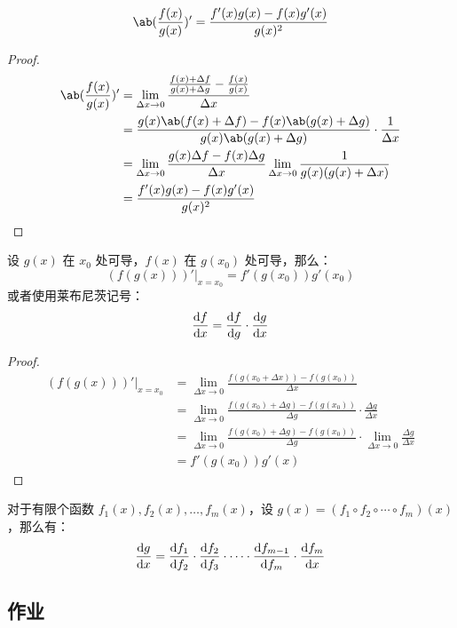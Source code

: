 \begin{theorem}[导数的除法法则]
	$$
	\ab(\frac{f(x)}{g(x)})' = \frac{f'(x) g(x) - f(x) g'(x)}{g(x)^2}
	$$
	\begin{proof}
		$$
		\begin{aligned}
			\ab(\frac{f(x)}{g(x)})' & = \lim_{\Delta x \to 0} \frac{\frac{f(x) + \Delta f}{g(x) + \Delta g} - \frac{f(x)}{g(x)}}{\Delta x} \\
			& = \frac{g(x) \ab(f(x) + \Delta f) - f(x) \ab(g(x) + \Delta g)}{g(x) \ab(g(x) + \Delta g)} \cdot \frac{1}{\Delta x} \\
			& = \lim_{\Delta x \to 0} \frac{g(x) \Delta f - f(x) \Delta g}{\Delta x} \lim_{\Delta x \to 0} \frac{1}{g(x) (g(x) + \Delta x)} \\
			& = \frac{f'(x) g(x) - f(x) g'(x)}{g(x)^2}
		\end{aligned}
		$$
	\end{proof}
\end{theorem}

\begin{theorem}[复合函数的链式求导法则]
	设 $g(x)$ 在 $x_0$ 处可导，$f(x)$ 在 $g(x_0)$ 处可导，那么：
	$$
	\left.(f(g(x)))'\right|_{x = x_0} = f'(g(x_0)) g'(x_0)
	$$
	或者使用莱布尼茨记号：
	$$
	\dv{f}{x} = \dv{f}{g} \cdot \dv{g}{x}
	$$

	\begin{proof}
		$$
		\begin{aligned}
			\left.(f(g(x)))'\right|_{x = x_0} & = \lim_{\Delta x \to 0} \frac{f(g(x_0 + \Delta x)) - f(g(x_0))}{\Delta x} \\
			& = \lim_{\Delta x \to 0} \frac{f(g(x_0) + \Delta g) - f(g(x_0))}{\Delta g} \cdot \frac{\Delta g}{\Delta x} \\
			& = \lim_{\Delta x \to 0} \frac{f(g(x_0) + \Delta g) - f(g(x_0))}{\Delta g} \cdot \lim_{\Delta x \to 0} \frac{\Delta g}{\Delta x} \\
			& = f'(g(x_0)) g'(x)
		\end{aligned}
		$$
	\end{proof}
\end{theorem}

\begin{corollary}
	对于有限个函数 $f_1(x), f_2(x), \dots, f_m(x)$，设 $g(x) = (f_1 \circ f_2 \circ \cdots \circ f_m)(x)$，那么有：
	$$
	\dv{g}{x} = \dv{f_1}{f_2} \cdot \dv{f_2}{f_3} \cdot \cdots \cdot \frac{\dd f_{m-1}}{\dd f_m} \cdot \dv{f_m}{x}
	$$
\end{corollary}

\subsection{作业}

